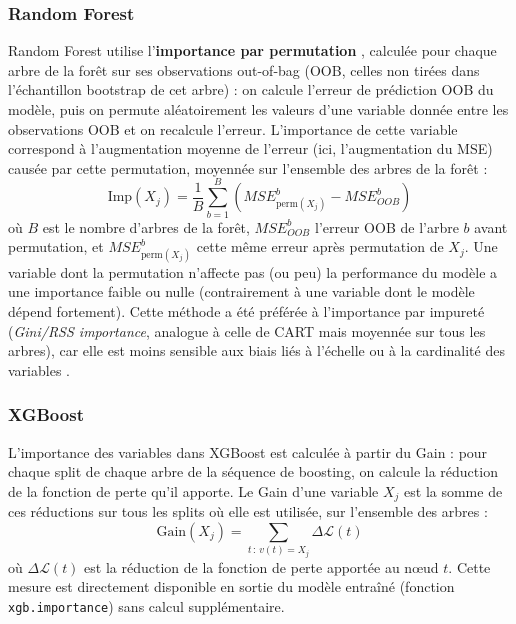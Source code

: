 \documentclass[11pt,a4paper,oneside]{report}
\begin{document}
	\subsubsection{Random Forest}
	Random Forest utilise l'\textbf{importance par permutation} \cite{breiman2001random}, calculée pour chaque arbre de la forêt sur ses observations out-of-bag (OOB, celles non tirées dans l'échantillon bootstrap de cet arbre) : on calcule l'erreur de prédiction OOB du modèle, puis on permute aléatoirement les valeurs d'une variable donnée entre les observations OOB et on recalcule l'erreur. L'importance de cette variable correspond à l'augmentation moyenne de l'erreur (ici, l'augmentation du MSE) causée par cette permutation, moyennée sur l'ensemble des arbres de la forêt \cite{wright2017ranger} :
	\begin{equation}
		\text{Imp}(X_j) = \frac{1}{B} \sum_{b=1}^{B} \left( MSE^{b}_{\text{perm}(X_j)} - MSE^{b}_{OOB} \right)
	\end{equation}
	où $B$ est le nombre d'arbres de la forêt, $MSE^{b}_{OOB}$ l'erreur OOB de l'arbre $b$ avant permutation, et $MSE^{b}_{\text{perm}(X_j)}$ cette même erreur après permutation de $X_j$. Une variable dont la permutation n'affecte pas (ou peu) la performance du modèle a une importance faible ou nulle (contrairement à une variable dont le modèle dépend fortement). Cette méthode a été préférée à l'importance par impureté (\textit{Gini/RSS importance}, analogue à celle de CART mais moyennée sur tous les arbres), car elle est moins sensible aux biais liés à l'échelle ou à la cardinalité des variables \cite{strobl2007bias}.
	
	\subsubsection{XGBoost}
	L'importance des variables dans XGBoost est calculée à partir du Gain : pour chaque split de chaque arbre de la séquence de boosting, on calcule la réduction de la fonction de perte qu'il apporte. Le Gain d'une variable $X_j$ est la somme de ces réductions sur tous les splits où elle est utilisée, sur l'ensemble des arbres \cite{chen2016xgboost} :
	\begin{equation}
		\text{Gain}(X_j) = \sum_{t \,:\, v(t) = X_j} \Delta \mathcal{L}(t)
	\end{equation}
	où $\Delta \mathcal{L}(t)$ est la réduction de la fonction de perte apportée au nœud $t$. Cette mesure est directement disponible en sortie du modèle entraîné (fonction \texttt{xgb.importance}) sans calcul supplémentaire.
	
\end{document}
